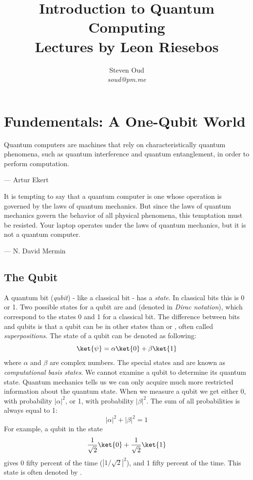 \documentclass[11pt, notitlepage]{report}
\title{\textbf{Introduction to Quantum Computing \\
\large Lectures by Leon Riesebos}}
\author{Steven Oud \\ \emph{soud@pm.me}}
\makeatletter
\newcommand*{\toccontents}{\@starttoc{toc}}
\makeatother
\begin{document}
\vfill
\maketitle

\toccontents

\newpage

\chapter{Fundementals: A One-Qubit World}
\epigraph{Quantum computers are machines that rely on characteristically quantum phenomena, such as quantum interference and quantum entanglement, in order to perform computation.}{--- Artur Ekert}

\epigraph{It is tempting to say that a quantum computer is one whose operation is governed by the laws of quantum mechanics. But since the laws of quantum mechanics govern the behavior of all physical phenomena, this temptation must be resisted. Your laptop operates under the laws of quantum mechanics, but it is not a quantum computer.}{--- N. David Mermin}

\section{The Qubit}
A quantum bit (\emph{qubit}) - like a classical bit - has a \emph{state}. In classical bits this is 0 or 1. Two possible states for a qubit are  and  (denoted in \emph{Dirac notation}), which correspond to the states 0 and 1 for a classical bit. The difference between bits and qubits is that a qubit can be in other states than  or , often called \emph{superpositions}. The state of a qubit can be denoted as following:
\[\ket{\psi} = \alpha\ket{0} + \beta\ket{1}\]
where $\alpha$ and $\beta$ are complex numbers. The special states  and  are known as \emph{computational basis states}. We cannot examine a qubit to determine its quantum state. Quantum mechanics tells us we can only acquire much more restricted information about the quantum state. When we measure a qubit we get either 0, with probability $|\alpha|^2$, or 1, with probability $|\beta|^2$. The sum of all probabilities is always equal to 1:
\[|\alpha|^2 + |\beta|^2 = 1\]
For example, a qubit in the state
\[
\dfrac{1}{\sqrt2}\ket{0}+\dfrac{1}{\sqrt2}\ket{1}
\]
gives 0 fifty percent of the time ($|1/\sqrt2|^2$), and 1 fifty percent of the time. This state is often denoted by \ket{+}.
\end{document}
